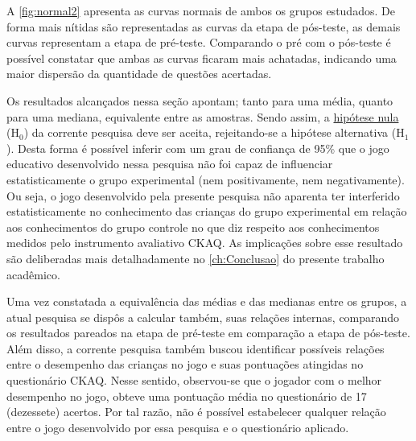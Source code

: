 A \autoref{fig:normal2} apresenta as curvas normais de ambos os grupos estudados. De forma mais nítidas são representadas as curvas da etapa de pós-teste, as demais curvas representam a etapa de pré-teste. Comparando o pré com o pós-teste é possível constatar que ambas as curvas ficaram mais achatadas, indicando uma maior dispersão da quantidade de questões acertadas. 

Os resultados alcançados nessa seção apontam; tanto para uma média, quanto para uma mediana, equivalente entre as amostras. Sendo assim, a \hyperref[hipotese]{hipótese nula} (H$_0$) da corrente pesquisa deve ser aceita, rejeitando-se a hipótese alternativa (H$_1$). Desta forma é possível inferir com um grau de confiança de 95\% que o jogo educativo desenvolvido nessa pesquisa não foi capaz de influenciar estatisticamente o grupo experimental (nem positivamente, nem negativamente). Ou seja, o jogo desenvolvido pela presente pesquisa não aparenta ter interferido estatisticamente no conhecimento das crianças do grupo experimental em relação aos conhecimentos do grupo controle no que diz respeito aos conhecimentos medidos pelo instrumento avaliativo \ac{CKAQ}. As implicações sobre esse resultado são deliberadas mais detalhadamente no \autoref{ch:Conclusao} do presente trabalho acadêmico.

Uma vez constatada a equivalência das médias e das medianas entre os grupos, a atual pesquisa se dispôs a calcular também, suas relações internas, comparando os resultados pareados na etapa de pré-teste em comparação a etapa de pós-teste. Além disso, a corrente pesquisa também buscou identificar possíveis relações entre o desempenho das crianças no jogo e suas pontuações atingidas no questionário \ac{CKAQ}. Nesse sentido, observou-se que o jogador com o melhor desempenho no jogo, obteve uma pontuação média no questionário de 17 (dezessete) acertos. Por tal razão, não é possível estabelecer qualquer relação entre o jogo desenvolvido por essa pesquisa e o questionário aplicado. 


